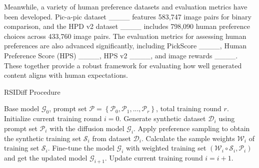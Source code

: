 Meanwhile, a variety of human preference datasets and evaluation metrics have been developed. Pic-a-pic dataset ____ features 583,747 image pairs for binary comparison, and the HPD v2 dataset ____ includes 798,090 human preference choices across 433,760 image pairs. 
%
The evaluation metrics for assessing human preferences are also advanced significantly, including PickScore ____, Human Preference Score (HPS) ____, HPS v2 ____, and image rewards ____. 
%
These together provide a robust framework for evaluating how well generated content aligns with human expectations.


\begin{algorithm}[tb]
   \caption{RSIDiff Procedure}
   \label{alg:rsidiff_procedure}
\begin{algorithmic}
    Base model $\mathcal{G}_0$, prompt set $\mathcal{P}=\left \{ \mathcal{P}_0, \mathcal{P}_1, ...,\mathcal{P}_r \right \}$, total training round $r$.
   \STATE Initialize current training round $i=0$.
   \REPEAT
   \STATE Generate synthetic dataset $\mathcal{D}_i$ using prompt set $\mathcal{P}_i$ with the diffusion model $\mathcal{G}_i$.
   \STATE Apply preference sampling to obtain the synthetic training set $\mathcal{S}_i$ from dataset $\mathcal{D}_i$.
   \STATE Calculate the sample weights $\mathcal{W}_i$ of training set $\mathcal{S}_i$.
   \STATE Fine-tune the model $\mathcal{G}_i$ with weighted training set $(\mathcal{W}_i\circ\mathcal{S}_i,\mathcal{P}_i)$ and get the updated model $\mathcal{G}_{i+1}$.
   \STATE Update current training round $i=i+1$.
\end{algorithmic}
\end{algorithm}